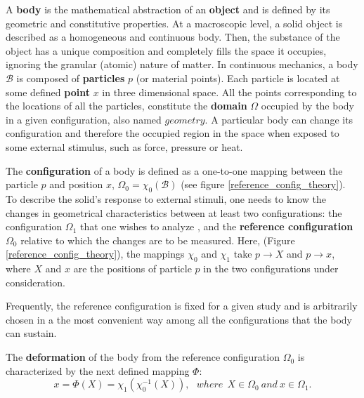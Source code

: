 	A \textbf{body} is the mathematical abstraction of an \textbf{object} and is defined by its geometric and constitutive properties.  At a macroscopic level, a solid object is described as a homogeneous and continuous body. Then, the substance of the object has a unique composition and completely fills the space it occupies, ignoring the granular (atomic) nature of matter. In continuous mechanics, a body $\mathcal{B}$ is composed of \textbf{particles} $p$  (or material points). Each particle is located at some defined \textbf{point}  $x$ in three dimensional space. All the points corresponding to the locations of all the particles, constitute the \textbf{domain} $\Omega$  occupied by the body in a given configuration, also named $geometry$. A particular body can change its configuration and therefore the occupied region in the space when exposed to some external stimulus, such as force, pressure or heat.
	
 The \textbf{configuration} of a body is defined as a one-to-one mapping between the particle $p$ and position $x$, $\Omega_0 = \chi_0 (\mathcal{B})$ (see figure \ref{reference_config_theory}). To describe the solid's response to external stimuli, one needs to know the changes in geometrical characteristics between at least two configurations: the configuration $\Omega_1$ that one wishes to analyze  , and the \textbf{reference configuration} $\Omega_0$  relative to which the changes are to be measured. Here, (Figure \ref{reference_config_theory}), the mappings $\chi_0$ and $\chi_1$ take $p \rightarrow X$ and $p \rightarrow x$, where $X$ and $x$ are the positions of particle $p$ in the two configurations under consideration.

Frequently, the reference configuration is fixed for a given study and is arbitrarily chosen in a the most convenient way among all the configurations that the body can sustain. 
 
 The \textbf{deformation} of the body from the reference configuration $\Omega_0$ is characterized by the next defined mapping $\Phi$:
 \begin{equation} 
 x = \Phi(X) = \chi_1(\chi_0^{-1}(X)), \ \ \  where \ \  X \in \Omega_0 \ and \ x \in \Omega_1.
 \label{referenceToCurrentCoordinates}
 \end{equation}
 

